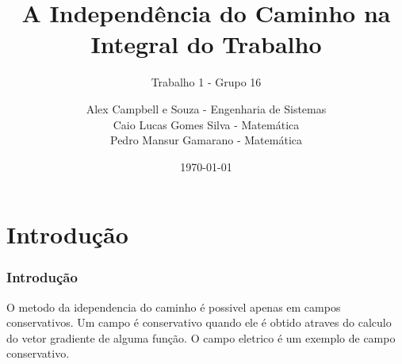 \documentclass{beamer}
\title{A Independência do Caminho na Integral do Trabalho}
\subtitle{Trabalho 1 - Grupo 16}
\author [Alex, Caio, Pedro]{
    \small Alex Campbell e Souza - Engenharia de Sistemas \\ 
    Caio Lucas Gomes Silva - Matemática \\ 
    Pedro Mansur Gamarano - Matemática
}
\institute[]{
    \large UFMG \\
    \footnotesize Universidade Federal de Minas Gerais \\
    \small Fundamentos de Eletromagnetismo
}
\date{\today}
\begin{document}
\frame{\titlepage}

\frame{\tableofcontents}

\section{Introdução}
\begin{frame}
    \frametitle{Introdução}
    O metodo da idependencia do caminho  é possivel apenas em  campos conservativos. Um campo é conservativo quando ele é obtido atraves do calculo do vetor gradiente de alguma função. 
    O campo eletrico é um exemplo de campo conservativo.



% 
% 
% 
% 
% 
\end{frame}
% 
\end{document}
